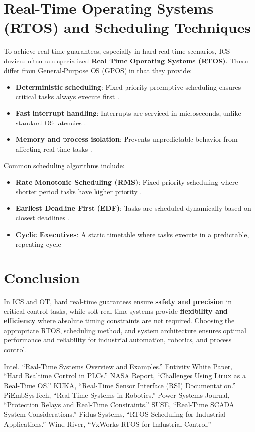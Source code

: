 \documentclass{article}
\begin{document}
\section{Real-Time Operating Systems (RTOS) and Scheduling Techniques}
To achieve real-time guarantees, especially in hard real-time scenarios, ICS devices often use specialized \textbf{Real-Time Operating Systems (RTOS)}. These differ from General-Purpose OS (GPOS) in that they provide:

\begin{itemize}
    \item \textbf{Deterministic scheduling}: Fixed-priority preemptive scheduling ensures critical tasks always execute first \cite{rtos_scheduling}.
    \item \textbf{Fast interrupt handling}: Interrupts are serviced in microseconds, unlike standard OS latencies \cite{vxworks_rtos}.
    \item \textbf{Memory and process isolation}: Prevents unpredictable behavior from affecting real-time tasks \cite{qnx_rtos}.
\end{itemize}

Common scheduling algorithms include:
\begin{itemize}
    \item \textbf{Rate Monotonic Scheduling (RMS)}: Fixed-priority scheduling where shorter period tasks have higher priority \cite{rms_scheduling}.
    \item \textbf{Earliest Deadline First (EDF)}: Tasks are scheduled dynamically based on closest deadlines \cite{edf_scheduling}.
    \item \textbf{Cyclic Executives}: A static timetable where tasks execute in a predictable, repeating cycle \cite{time_triggered}.
\end{itemize}

\section{Conclusion}
In ICS and OT, hard real-time guarantees ensure \textbf{safety and precision} in critical control tasks, while soft real-time systems provide \textbf{flexibility and efficiency} where absolute timing constraints are not required. Choosing the appropriate RTOS, scheduling method, and system architecture ensures optimal performance and reliability for industrial automation, robotics, and process control.


\begin{thebibliography}{99}
 Intel, “Real-Time Systems Overview and Examples.”
 Entivity White Paper, “Hard Realtime Control in PLCs.”
 NASA Report, “Challenges Using Linux as a Real-Time OS.”
 KUKA, “Real-Time Sensor Interface (RSI) Documentation.”
 PiEmbSysTech, “Real-Time Systems in Robotics.”
 Power Systems Journal, “Protection Relays and Real-Time Constraints.”
 SUSE, “Real-Time SCADA System Considerations.”
 Fidus Systems, “RTOS Scheduling for Industrial Applications.”
 Wind River, “VxWorks RTOS for Industrial Control.”
\end{thebibliography}
\end{document}
